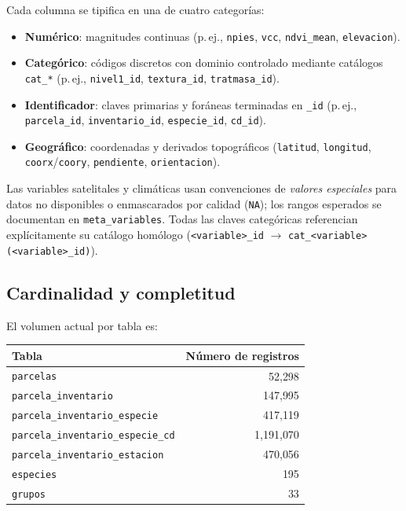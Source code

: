Cada columna se tipifica en una de cuatro categorías:
\begin{itemize}
  \item \textbf{Numérico}: magnitudes continuas (p.\,ej., \texttt{npies}, \texttt{vcc}, \texttt{ndvi\_mean}, \texttt{elevacion}).
  \item \textbf{Categórico}: códigos discretos con dominio controlado mediante catálogos \texttt{cat\_*} (p.\,ej., \texttt{nivel1\_id}, \texttt{textura\_id}, \texttt{tratmasa\_id}).
  \item \textbf{Identificador}: claves primarias y foráneas terminadas en \texttt{\_id} (p.\,ej., \texttt{parcela\_id}, \texttt{inventario\_id}, \texttt{especie\_id}, \texttt{cd\_id}).
  \item \textbf{Geográfico}: coordenadas y derivados topográficos (\texttt{latitud}, \texttt{longitud}, \texttt{coorx}/\texttt{coory}, \texttt{pendiente}, \texttt{orientacion}).
\end{itemize}

Las variables satelitales y climáticas usan convenciones de \emph{valores especiales} para datos no disponibles o enmascarados por calidad (\texttt{NA}); los rangos esperados se documentan en \texttt{meta\_variables}. Todas las claves categóricas referencian explícitamente su catálogo homólogo (\texttt{<variable>\_id} $\rightarrow$ \texttt{cat\_<variable>(<variable>\_id)}).

\subsection*{Cardinalidad y completitud}

El volumen actual por tabla es:
\begin{center}
\begin{tabular}{l r}
\toprule
\textbf{Tabla} & \textbf{Número de registros} \\
\midrule
\texttt{parcelas} & 52{,}298 \\
\texttt{parcela\_inventario} & 147{,}995 \\
\texttt{parcela\_inventario\_especie} & 417{,}119 \\
\texttt{parcela\_inventario\_especie\_cd} & 1{,}191{,}070 \\
\texttt{parcela\_inventario\_estacion} & 470{,}056 \\
\texttt{especies} & 195 \\
\texttt{grupos} & 33 \\
\bottomrule
\end{tabular}
\end{center}

